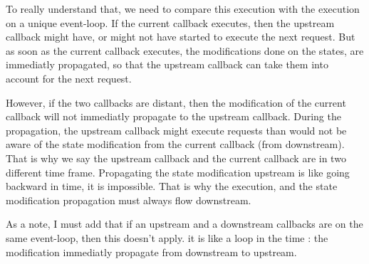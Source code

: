 To really understand that, we need to compare this execution with the execution on a unique event-loop.
If the current callback executes, then the upstream callback might have, or might not have started to execute the next request.
But as soon as the current callback executes, the modifications done on the states, are immediatly propagated, so that the upstream callback can take them into account for the next request.

However, if the two callbacks are distant, then the modification of the current callback will not immediatly propagate to the upstream callback.
During the propagation, the upstream callback might execute requests than would not be aware of the state modification from the current callback (from downstream).
That is why we say the upstream callback and the current callback are in two different time frame.
Propagating the state modification upstream is like going backward in time, it is impossible.
That is why the execution, and the state modification propagation must always flow downstream.

As a note, I must add that if an upstream and a downstream callbacks are on the same event-loop, then this doesn't apply. it is like a loop in the time : the modification immediatly propagate from downstream to upstream.
















